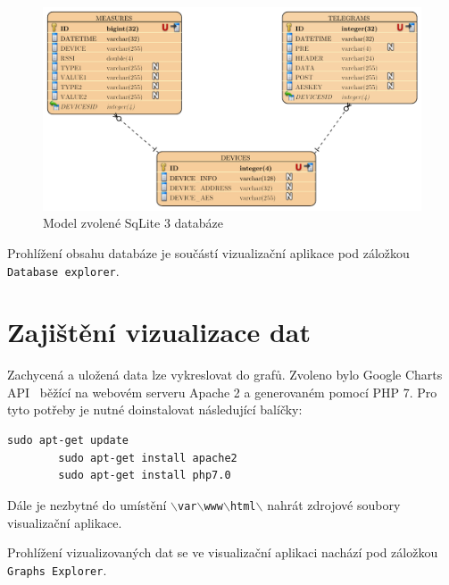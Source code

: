 \begin{figure}[!ht]
  \begin{center}
    \includegraphics[scale=0.80]{obrazky/aplikace_databaze}
  \end{center}
	\vspace{-15pt}
  \caption{Model zvolené SqLite 3 databáze}
	\label{databazovy_model}
\end{figure}

Prohlížení obsahu databáze je součástí vizualizační aplikace pod záložkou \texttt{Database explorer}.

\newpage

\section{Zajištění vizualizace dat}	
\label{SectionVizualizaceDat}
Zachycená a uložená data lze vykreslovat do grafů. Zvoleno bylo Google Charts API~\cite{uvod_google_charts_api} běžící na webovém serveru Apache 2 a generovaném pomocí PHP 7. Pro tyto potřeby je nutné doinstalovat následující balíčky:
 
\begin{lstlisting}[style=MyCodeBash]
		sudo apt-get update
		sudo apt-get install apache2
		sudo apt-get install php7.0 
	\end{lstlisting}

Dále je nezbytné do umístění \texttt{$\backslash$var$\backslash$www$\backslash$html$\backslash$} nahrát zdrojové soubory visualizační aplikace. 

Prohlížení vizualizovaných dat se ve visualizační aplikaci nachází pod záložkou \texttt{Graphs Explorer}.

